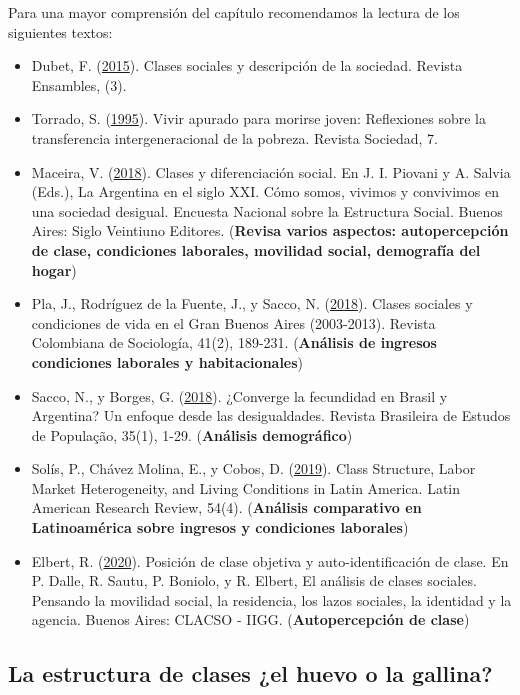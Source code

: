 \documentclass[
]{article}
\begin{document}
Para una mayor comprensión del capítulo recomendamos la lectura de los siguientes textos:

\begin{itemize}
\item
  Dubet, F. (\protect\hyperlink{ref-Dubet2015}{2015}). Clases sociales y descripción de la sociedad. Revista Ensambles, (3).
\item
  Torrado, S. (\protect\hyperlink{ref-Torrado1995}{1995}). Vivir apurado para morirse joven: Reflexiones sobre la transferencia intergeneracional de la pobreza. Revista Sociedad, 7.
\item
  Maceira, V. (\protect\hyperlink{ref-Maceira2018}{2018}). Clases y diferenciación social. En J. I. Piovani y A. Salvia (Eds.), La Argentina en el siglo XXI. Cómo somos, vivimos y convivimos en una sociedad desigual. Encuesta Nacional sobre la Estructura Social. Buenos Aires: Siglo Veintiuno Editores. (\textbf{Revisa varios aspectos: autopercepción de clase, condiciones laborales, movilidad social, demografía del hogar})
\item
  Pla, J., Rodríguez de la Fuente, J., y Sacco, N. (\protect\hyperlink{ref-Pla.etal2018}{2018}). Clases sociales y condiciones de vida en el Gran Buenos Aires (2003-2013). Revista Colombiana de Sociología, 41(2), 189-231. (\textbf{Análisis de ingresos condiciones laborales y habitacionales})
\item
  Sacco, N., y Borges, G. (\protect\hyperlink{ref-Sacco2018}{2018}). ¿Converge la fecundidad en Brasil y Argentina? Un enfoque desde las desigualdades. Revista Brasileira de Estudos de População, 35(1), 1-29. (\textbf{Análisis demográfico})
\item
  Solís, P., Chávez Molina, E., y Cobos, D. (\protect\hyperlink{ref-Solis.etal2019}{2019}). Class Structure, Labor Market Heterogeneity, and Living Conditions in Latin America. Latin American Research Review, 54(4). (\textbf{Análisis comparativo en Latinoamérica sobre ingresos y condiciones laborales})
\item
  Elbert, R. (\protect\hyperlink{ref-Elbert2020}{2020}). Posición de clase objetiva y auto-identificación de clase. En P. Dalle, R. Sautu, P. Boniolo, y R. Elbert, El análisis de clases sociales. Pensando la movilidad social, la residencia, los lazos sociales, la identidad y la agencia. Buenos Aires: CLACSO - IIGG. (\textbf{Autopercepción de clase})
\end{itemize}

\hypertarget{huevo}{%
\subsection{La estructura de clases ¿el huevo o la gallina?}\label{huevo}}
\end{document}
